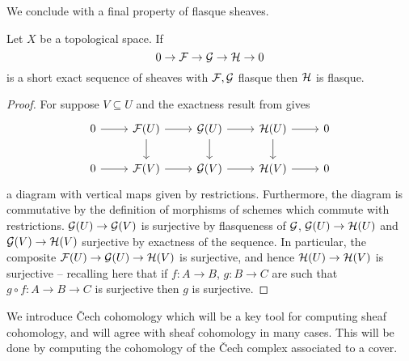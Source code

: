We conclude with a final property of flasque sheaves. 
\begin{proposition}\label{prop: flasque sheaves are 2 of 3}
    Let $X$ be a topological space. If 
    $$0\to\mathcal{F}\to\mathcal{G}\to\mathcal{H}\to0$$
    is a short exact sequence of sheaves with $\mathcal{F},\mathcal{G}$ flasque then $\mathcal{H}$ is flasque. 
\end{proposition}
\begin{proof}
    For suppose $V\subseteq U$ and the exactness result from  gives 
    $$
    \begin{tikzcd}
        0 & {\Fcal(U)} & {\Gcal(U)} & {\Hcal(U)} & 0 \\
        0 & {\Fcal(V)} & {\Gcal(V)} & {\Hcal(V)} & 0
        \arrow[from=1-1, to=1-2]
        \arrow[from=1-2, to=1-3]
        \arrow[from=1-3, to=1-4]
        \arrow[from=1-4, to=1-5]
        \arrow[from=2-1, to=2-2]
        \arrow[from=2-2, to=2-3]
        \arrow[from=2-3, to=2-4]
        \arrow[from=2-4, to=2-5]
        \arrow[from=1-4, to=2-4]
        \arrow[from=1-3, to=2-3]
        \arrow[from=1-2, to=2-2]
    \end{tikzcd}$$
    a diagram with vertical maps given by restrictions. Furthermore, the diagram is commutative by the definition of morphisms of schemes which commute with restrictions. $\mathcal{G}(U)\to\mathcal{G}(V)$ is surjective by flasqueness of $\mathcal{G}$, $\mathcal{G}(U)\to\mathcal{H}(U)$ and $\mathcal{G}(V)\to\mathcal{H}(V)$ surjective by exactness of the sequence. In particular, the composite $\mathcal{F}(U)\to\mathcal{G}(U)\to\mathcal{H}(V)$ is surjective, and hence $\mathcal{H}(U)\to\mathcal{H}(V)$ is surjective -- recalling here that if $f:A\to B$, $g:B\to C$ are such that $g\circ f:A\to B\to C$ is surjective then $g$ is surjective.
\end{proof}
We introduce \v{C}ech cohomology which will be a key tool for computing sheaf cohomology, and will agree with sheaf cohomology in many cases. This will be done by computing the cohomology of the \v{C}ech complex associated to a cover. 
